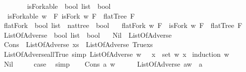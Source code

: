 \begin{isabellebody}
\isamarkupfalse%
%
\endisatagproof
{\isafoldproof}%
%
\isadelimproof
\ \ \ \ \ \ \isanewline
%
\endisadelimproof
\isanewline
{}\isamarkupfalse%
\ isForkable\ {\isacharcolon}{\isacharcolon}\ {\isachardoublequoteopen}bool\ list\ {\isasymRightarrow}\ bool{\isachardoublequoteclose}\ \isanewline
\ \ {\isachardoublequoteopen}isForkable\ w\ {\isacharequal}\ {\isacharparenleft}{\isasymexists}F{\isachardot}\ isFork\ w\ F\ {\isasymand}\ flatTree\ F{\isacharparenright}{\isachardoublequoteclose}\isanewline
\ \ \isanewline
{}\isamarkupfalse%
\ flatFork\ {\isacharcolon}{\isacharcolon}\ {\isachardoublequoteopen}bool\ list\ {\isasymRightarrow}\ nattree\ {\isasymRightarrow}\ bool{\isachardoublequoteclose}\ \isanewline
\ \ {\isachardoublequoteopen}flatFork\ w\ F\ {\isacharequal}\ {\isacharparenleft}isFork\ w\ F\ {\isasymand}\ flatTree\ F{\isacharparenright}{\isachardoublequoteclose}\isanewline
\isanewline
{}\isamarkupfalse%
\ ListOfAdverse\ {\isacharcolon}{\isacharcolon}\ {\isachardoublequoteopen}bool\ list\ {\isasymRightarrow}\ bool{\isachardoublequoteclose}\ \isanewline
\ \ Nil\ {\isacharcolon}\ {\isachardoublequoteopen}ListOfAdverse\ {\isacharbrackleft}{\isacharbrackright}{\isachardoublequoteclose}\ \ \isanewline
{\isacharbar}\ Cons\ {\isacharcolon}\ {\isachardoublequoteopen}ListOfAdverse\ xs\ {\isasymLongrightarrow}\ ListOfAdverse\ {\isacharparenleft}True{\isacharhash}xs{\isacharparenright}{\isachardoublequoteclose}\isanewline
\ \ \isanewline
{}\isamarkupfalse%
\ ListOfAdverse{\isacharunderscore}all{\isacharunderscore}True\ {\isacharbrackleft}simp{\isacharbrackright}{\isacharcolon}\ {\isachardoublequoteopen}ListOfAdverse\ w\ {\isasymlongrightarrow}\ {\isacharparenleft}{\isasymforall}\ x\ {\isasymin}\ set\ w{\isachardot}\ x{\isacharparenright}{\isachardoublequoteclose}\isanewline
%
\isadelimproof
%
\endisadelimproof
%
\isatagproof
{}\isamarkupfalse%
\ {\isacharparenleft}induction\ w{\isacharparenright}\isanewline
\ \ \isamarkupfalse%
\ Nil\isanewline
\ \ \isamarkupfalse%
\ \isamarkupfalse%
\ {\isacharquery}case\ \isamarkupfalse%
\ simp\isanewline
{}\isamarkupfalse%
\isanewline
\ \ \isamarkupfalse%
\ {\isacharparenleft}Cons\ a\ w{\isacharparenright}\isanewline
\ \ \ \ \isamarkupfalse%
\ {\isachardoublequoteopen}ListOfAdverse\ {\isacharparenleft}a{\isacharhash}w{\isacharparenright}\ {\isasymlongrightarrow}\ a{\isachardoublequoteclose}\isanewline

\end{isabellebody}
